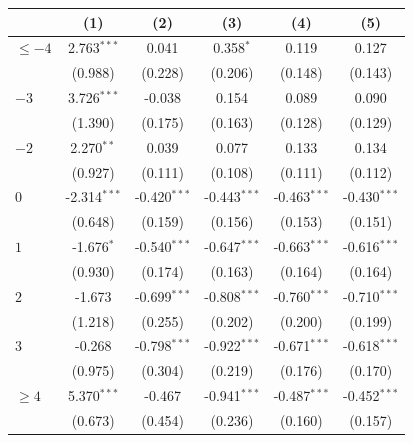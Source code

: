 
\begingroup
\centering
\begin{tabular}{lccccc}
   \toprule
                        & (1)            & (2)            & (3)            & (4)            & (5)\\  
   \midrule 
   $\leq -4$            & 2.763$^{***}$  & 0.041          & 0.358$^{*}$    & 0.119          & 0.127\\   
                        & (0.988)        & (0.228)        & (0.206)        & (0.148)        & (0.143)\\   
   $-3$                 & 3.726$^{***}$  & -0.038         & 0.154          & 0.089          & 0.090\\   
                        & (1.390)        & (0.175)        & (0.163)        & (0.128)        & (0.129)\\   
   $-2$                 & 2.270$^{**}$   & 0.039          & 0.077          & 0.133          & 0.134\\   
                        & (0.927)        & (0.111)        & (0.108)        & (0.111)        & (0.112)\\   
   $0$                  & -2.314$^{***}$ & -0.420$^{***}$ & -0.443$^{***}$ & -0.463$^{***}$ & -0.430$^{***}$\\   
                        & (0.648)        & (0.159)        & (0.156)        & (0.153)        & (0.151)\\   
   $1$                  & -1.676$^{*}$   & -0.540$^{***}$ & -0.647$^{***}$ & -0.663$^{***}$ & -0.616$^{***}$\\   
                        & (0.930)        & (0.174)        & (0.163)        & (0.164)        & (0.164)\\   
   $2$                  & -1.673         & -0.699$^{***}$ & -0.808$^{***}$ & -0.760$^{***}$ & -0.710$^{***}$\\   
                        & (1.218)        & (0.255)        & (0.202)        & (0.200)        & (0.199)\\   
   $3$                  & -0.268         & -0.798$^{***}$ & -0.922$^{***}$ & -0.671$^{***}$ & -0.618$^{***}$\\   
                        & (0.975)        & (0.304)        & (0.219)        & (0.176)        & (0.170)\\   
   $\geq 4$             & 5.370$^{***}$  & -0.467         & -0.941$^{***}$ & -0.487$^{***}$ & -0.452$^{***}$\\   
                        & (0.673)        & (0.454)        & (0.236)        & (0.160)        & (0.157)\\   

\end{tabular}
